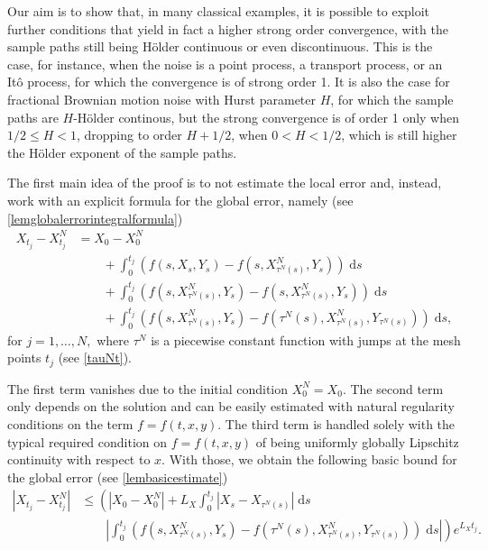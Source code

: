 \documentclass[reqno,12pt]{amsart}
\theoremstyle{plain}%
\theoremstyle{definition}
\begin{document}
Our aim is to show that, in many classical examples, it is possible to exploit further conditions that yield in fact a higher strong order convergence, with the sample paths still being H\"older continuous or even discontinuous. This is the case, for instance, when the noise is a point process, a transport process, or an It\^o process, for which the convergence is of strong order 1. It is also the case for fractional Brownian motion noise with Hurst parameter $H$, for which the sample paths are $H$-H\"older continous, but the strong convergence is of order 1 only when $1/2 \leq H < 1$, dropping to order $H + 1/2$, when $0 < H < 1/2$, which is still higher the H\"older exponent of the sample paths.

The first main idea of the proof is to not estimate the local error and, instead, work with an explicit formula for the global error, namely (see \cref{lemglobalerrorintegralformula})
\begin{equation}
    \label{lemglobalerrorintegralformulaintro}
    \begin{aligned}
        X_{t_j} - X_{t_j}^N & = X_0 - X_0^N \\
        & \qquad + \int_0^{t_j} \left( f(s, X_s, Y_s) - f(s, X_{\tau^N(s)}^N, Y_s) \right)\;\mathrm{d}s  \\ 
        & \qquad + \int_{0}^{t_j} \left( f(s, X_{\tau^N(s)}^N, Y_s) - f(s, X_{\tau^N(s)}^N, Y_s) \right)\;\mathrm{d}s \\
        & \qquad + \int_0^{t_j} \left( f(s, X_{\tau^N(s)}^N, Y_s) - f(\tau^N(s), X_{\tau^N(s)}^N, Y_{\tau^N(s)}) \right)\;\mathrm{d}s,
    \end{aligned}
\end{equation}
for $j = 1, \ldots, N,$ where $\tau^N$ is a piecewise constant function with jumps at the mesh points $t_j$ (see \cref{tauNt}).

The first term vanishes due to the initial condition $X_0^N = X_0$. The second term only depends on the solution and can be easily estimated with natural regularity conditions on the term $f=f(t, x, y)$. The third term is handled solely with the typical required condition on $f=f(t, x, y)$ of being uniformly globally Lipschitz continuity with respect to $x$. With those, we obtain the following basic bound for the global error (see \cref{lembasicestimate})
\begin{equation}
    \label{Etjbasicboundintro}
    \begin{aligned}
        |X_{t_j} - X_{t_j}^N| & \leq \left( |X_0 - X_0^N| + L_X \int_0^{t_j} |X_s - X_{\tau^N(s)}| \;\mathrm{d}s \right. \\
        & \qquad \left. \left|\int_0^{t_j} \left( f(s, X_{\tau^N(s)}^N, Y_s) - f(\tau^N(s), X_{\tau^N(s)}^N, Y_{\tau^N(s)}) \right)\;\mathrm{d}s\right|\right) e^{L_X t_j}.
    \end{aligned}
\end{equation}
\end{document}
